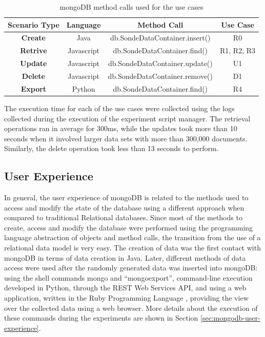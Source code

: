 \begin{table}[!h]
    \begin{center}
        \begin{tabular}{|c|c|c|c|}\hline
        \textbf{Scenario Type} & \textbf{Language} & \textbf{Method Call} & \textbf{Use Case}\\\hline 
        \textbf{Create} & Java & db.SondeDataContainer.insert() & R0\\\hline
        \textbf{Retrive} & Javascript & db.SondeDataContainer.find() & R1, R2, R3\\\hline 
        \textbf{Update} & Javascript & db.SondeDataContainer.update() & U1\\\hline 
        \textbf{Delete} & Javascript & db.SondeDataContainer.remove() & D1\\\hline
        \textbf{Export} & Python & db.SondeDataContainer.find() & R4\\\hline
        \end{tabular}
        \caption{mongoDB method calls used for the use cases}
    \end{center}
    \label{tab:experiment-scenarios-mongo-methods}
\end{table}

The execution time for each of the use cases were collected using the logs
collected during the execution of the experiment script manager. The retrieval
operations ran in average for 300ms, while the updates took more than 10
seconds when it involved larger data sets with more than 300,000 documents.
Similarly, the delete operation took less than 13 seconds to perform.

\subsection{User Experience}
\label{sec:experiments-user-experimence}

In general, the user experience of mongoDB is related to the methods used to
access and modify the state of the database using a different approach when
compared to traditional Relational databases. Since most of the methods to
create, access and modify the database were performed using the programming
language abstraction of objects and method calls, the transition from the use
of a relational data model is very easy. The creation of data was the first
contact with mongoDB in terms of data creation in Java. Later, different
methods of data access were used after the randomly generated data was
inserted into mongoDB: using the shell commands mongo and ``mongoexport'',
command-line execution developed in Python, through the REST Web Services API,
and using a web application, written in the Ruby Programming Language
\cite{ruby}, providing the view over the collected data using a web browser.
More details about the execution of these commands during the experiments are
shown in Section \ref{sec:mongodb-user-experience}.

